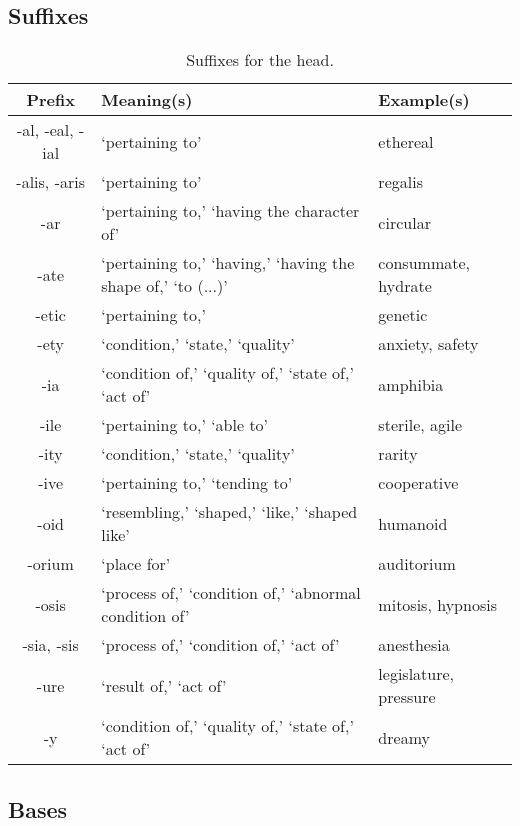 \subsection{Suffixes}

\begin{longtable}{c | p{} | p{}}
    \caption{Suffixes for the head.}
    \hline
    Prefix & Meaning(s) & Example(s) \\ \hline
        -al, -eal, -ial & `pertaining to' & ethereal \\
        -alis, -aris & `pertaining to' & regalis \\
        -ar & `pertaining to,' `having the character of' & circular \\
        -ate & `pertaining to,' `having,' `having the shape of,' `to (...)' & consummate, hydrate \\
        -etic & `pertaining to,' & genetic \\
        -ety & `condition,' `state,' `quality' & anxiety, safety \\
        -ia & `condition of,' `quality of,' `state of,' `act of' & amphibia \\
        -ile & `pertaining to,' `able to' & sterile, agile \\
        -ity & `condition,' `state,' `quality' & rarity \\
        -ive & `pertaining to,' `tending to' & cooperative \\
        -oid & `resembling,' `shaped,' `like,' `shaped like' & humanoid \\
        -orium & `place for' & auditorium \\
        -osis & `process of,' `condition of,' `abnormal condition of' & mitosis, hypnosis \\
        -sia, -sis & `process of,' `condition of,' `act of' & anesthesia \\
        -ure & `result of,' `act of' & legislature, pressure \\
        -y & `condition of,' `quality of,' `state of,' `act of' & dreamy 
    \label{tab:Ch3Suffix}
\end{longtable}




\subsection{Bases}


